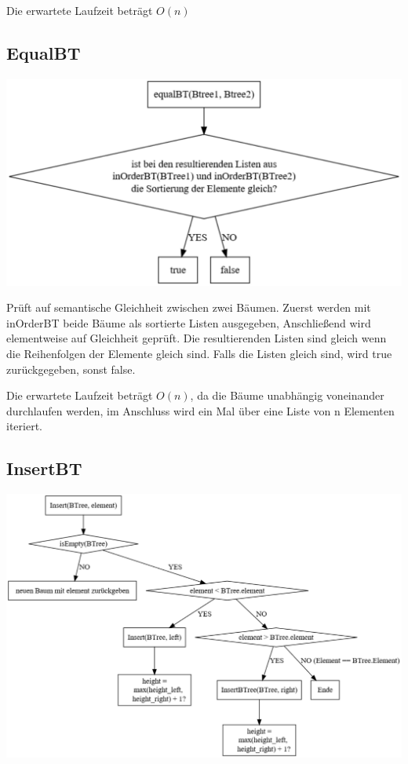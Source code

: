 \documentclass[11pt]{article}
\begin{document}
    Die erwartete Laufzeit beträgt
    \begin{math}
        O(n)
    \end{math}

    \subsection{EqualBT}\label{subsec:equalbt}
    
    \begin{center}
        \includegraphics[width=1.2\columnwidth] {equal.pdf}
    \end{center}
    
    Prüft auf semantische Gleichheit zwischen zwei Bäumen.
    Zuerst werden mit inOrderBT beide Bäume als sortierte Listen ausgegeben,
    Anschließend wird elementweise auf Gleichheit geprüft.
    Die resultierenden Listen sind gleich wenn die Reihenfolgen der Elemente gleich sind.
    Falls die Listen gleich sind, wird true zurückgegeben, sonst false.

    Die erwartete Laufzeit beträgt
    \begin{math}
        O(n)
    \end{math},
    da die Bäume unabhängig voneinander durchlaufen werden, im Anschluss wird
    ein Mal über eine Liste von n Elementen iteriert.

    \subsection{InsertBT}\label{subsec:insertbt}

    \begin{center}
        \includegraphics[width=1.2\columnwidth] {insert.pdf}
    \end{center}
\end{document}

